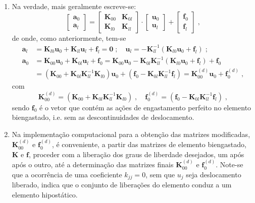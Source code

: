 \begin{enumerate}
	\item Na verdade, mais geralmente escreve-se:
	      \[ \left[ \begin{array}{c}
				      \mathbf{a}_0 \\ \mathbf{a}_l
			      \end{array} \right] = \left[ \begin{array}{cc}
				      \mathbf{K}_{00} & \mathbf{K}_{0l} \\ \mathbf{K}_{l0} & \mathbf{K}_{ll}\end{array} \right]\!\cdot\!
		      \left[ \begin{array}{c}
				      \mathbf{u}_0 \\ \mathbf{u}_l
			      \end{array} \right] + \left[ \begin{array}{c}
				      \mathbf{f}_0 \\ \mathbf{f}_l
			      \end{array} \right] \; ,
	      \]
	      \noindent de onde, como anteriormente, tem-se
	      \begin{align*} \mathbf{a}_l & =   \mathbf{K}_{l0}\mathbf{u}_0+ \mathbf{K}_{ll}\mathbf{u}_l + \mathbf{f}_l= \mathbf{0} \; ; \quad \mathbf{u}_l=-\mathbf{K}_{ll}^{-1}\left( \mathbf{K}_{l0}\mathbf{u}_0 + \mathbf{f}_l \right) \; ; \\
	                     \mathbf{a}_0 & =   \mathbf{K}_{00}\mathbf{u}_0+ \mathbf{K}_{0l}\mathbf{u}_l + \mathbf{f}_0=
	                     \mathbf{K}_{00}\mathbf{u}_0- \mathbf{K}_{0l}\mathbf{K}_{ll}^{-1}\left( \mathbf{K}_{l0}\mathbf{u}_0 + \mathbf{f}_l\right) + \mathbf{f}_0                                                            \\
	                              & =  \left( \mathbf{K}_{00}+ \mathbf{K}_{0l}\mathbf{K}_{ll}^{-1}\mathbf{K}_{l0}\right)\mathbf{u}_0 +\left( \mathbf{f}_0-
	                     \mathbf{K}_{0l}\mathbf{K}_{ll}^{-1}\mathbf{f}_l\right) = \mathbf{K}_{00}^{(d)}\mathbf{u}_{0} + \mathbf{f}_0^{(d)} \; ,
	      \end{align*}
	      \noindent com
	      \[\mathbf{K}_{00}^{(d)}=\left( \mathbf{K}_{00}+ \mathbf{K}_{0l}\mathbf{K}_{ll}^{-1}\mathbf{K}_{l0}\right)\; , \quad \mathbf{f}_0^{(d)}= \left( \mathbf{f}_0-
		      \mathbf{K}_{0l}\mathbf{K}_{ll}^{-1}\mathbf{f}_l\right) \; ,
	      \]
	      \noindent sendo \(\mathbf{f}_0\) é o vetor que contém as ações de engastamento perfeito no elemento biengastado, i.e. sem as descontinuidades de deslocamento.

	\item Na implementação computacional para a obtenção das matrizes modificadas, \(\mathbf{K}_{00}^{(d)}\) e \(\mathbf{f}_{0}^{(d)}\), é conveniente, a partir das matrizes de elemento biengastado, \(\mathbf{K}\) e \(\mathbf{f}\), proceder com a liberação dos graus de liberdade desejados, um após após o outro, até a determinação  das matrizes finais \(\mathbf{K}_{00}^{(d)}\) e \(\mathbf{f}_{0}^{(d)}\). Note-se que a ocorrência de uma coeficiente \(k_{jj}\!=\!0\), sem que \(u_j\) seja deslocamento liberado, indica que o conjunto de liberações do elemento conduz a um elemento hipostático.
\end{enumerate}

